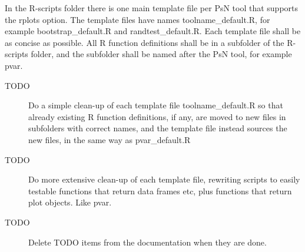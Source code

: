In the R-scripts folder there is one main template file per PsN tool
that supports the rplots option.
The template files have names
toolname\_default.R, for example bootstrap\_default.R and randtest\_default.R.
Each template file shall be as concise as possible. All
R function definitions shall be in a subfolder of the R-scripts folder, and the
subfolder shall be named after the PsN tool, for example pvar.

\begin{description}
\item[TODO]
  Do a simple clean-up of each template file toolname\_default.R so that already existing
  R function definitions, if any, are moved
  to new files in subfolders with correct names, and the template file instead sources the
  new files, in the same way as pvar\_default.R
\item[TODO] Do more extensive clean-up of each template file, rewriting scripts to easily testable functions that return
  data frames etc, plus functions that return plot objects. Like pvar.
\item[TODO] Delete TODO items from the documentation when they are done.
\end{description}



